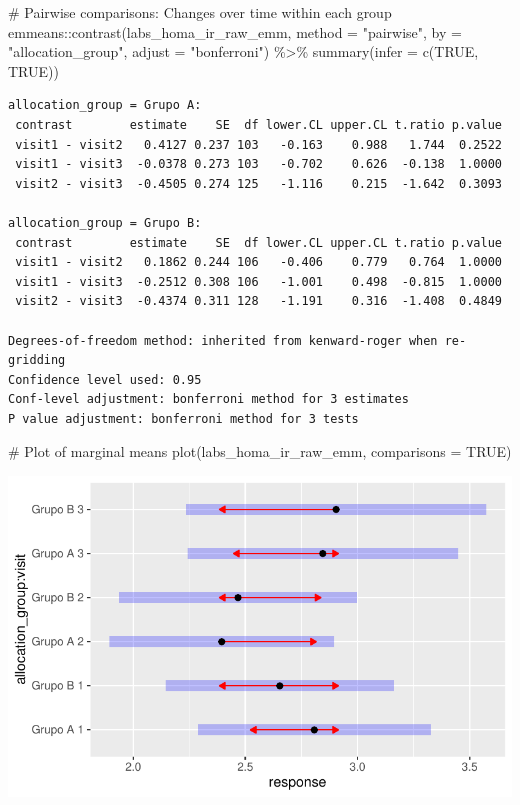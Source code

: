 \documentclass[
  12pt,
]{article}
\newenvironment{Shaded}{\begin{snugshade}}{\end{snugshade}}
\newcommand{\AttributeTok}[1]{\textcolor[rgb]{0.40,0.45,0.13}{#1}}
\newcommand{\CommentTok}[1]{\textcolor[rgb]{0.37,0.37,0.37}{#1}}
\newcommand{\ConstantTok}[1]{\textcolor[rgb]{0.56,0.35,0.01}{#1}}
\newcommand{\FunctionTok}[1]{\textcolor[rgb]{0.28,0.35,0.67}{#1}}
\newcommand{\NormalTok}[1]{\textcolor[rgb]{0.00,0.23,0.31}{#1}}
\newcommand{\SpecialCharTok}[1]{\textcolor[rgb]{0.37,0.37,0.37}{#1}}
\newcommand{\StringTok}[1]{\textcolor[rgb]{0.13,0.47,0.30}{#1}}
\begin{document}
\begin{Shaded}
\begin{Highlighting}[]
\CommentTok{\# Pairwise comparisons: Changes over time within each group}
\NormalTok{emmeans}\SpecialCharTok{::}\FunctionTok{contrast}\NormalTok{(labs\_homa\_ir\_raw\_emm,}
\AttributeTok{method =} \StringTok{"pairwise"}\NormalTok{, }\AttributeTok{by =} \StringTok{"allocation\_group"}\NormalTok{,}
\AttributeTok{adjust =} \StringTok{"bonferroni"}\NormalTok{) }\SpecialCharTok{\%\textgreater{}\%} \FunctionTok{summary}\NormalTok{(}\AttributeTok{infer =} \FunctionTok{c}\NormalTok{(}\ConstantTok{TRUE}\NormalTok{, }\ConstantTok{TRUE}\NormalTok{))}
\end{Highlighting}
\end{Shaded}

\begin{verbatim}
allocation_group = Grupo A:
 contrast        estimate    SE  df lower.CL upper.CL t.ratio p.value
 visit1 - visit2   0.4127 0.237 103   -0.163    0.988   1.744  0.2522
 visit1 - visit3  -0.0378 0.273 103   -0.702    0.626  -0.138  1.0000
 visit2 - visit3  -0.4505 0.274 125   -1.116    0.215  -1.642  0.3093

allocation_group = Grupo B:
 contrast        estimate    SE  df lower.CL upper.CL t.ratio p.value
 visit1 - visit2   0.1862 0.244 106   -0.406    0.779   0.764  1.0000
 visit1 - visit3  -0.2512 0.308 106   -1.001    0.498  -0.815  1.0000
 visit2 - visit3  -0.4374 0.311 128   -1.191    0.316  -1.408  0.4849

Degrees-of-freedom method: inherited from kenward-roger when re-gridding 
Confidence level used: 0.95 
Conf-level adjustment: bonferroni method for 3 estimates 
P value adjustment: bonferroni method for 3 tests 
\end{verbatim}

\begin{Shaded}
\begin{Highlighting}[]
\CommentTok{\# Plot of marginal means}
\FunctionTok{plot}\NormalTok{(labs\_homa\_ir\_raw\_emm, }\AttributeTok{comparisons =} \ConstantTok{TRUE}\NormalTok{)}
\end{Highlighting}
\end{Shaded}

\includegraphics{Outcomes_files/figure-pdf/labs_homa_ir_raw_emm-1.pdf}
\end{document}
